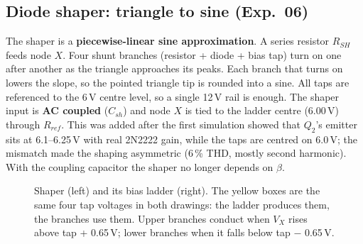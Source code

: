 \subsection{Diode shaper: triangle to sine (Exp.\ 06)}
The shaper is a \textbf{piecewise-linear sine approximation}. A series resistor $R_{SH}$ feeds node $X$. Four shunt branches (resistor + diode + bias tap) turn on one after another as the triangle approaches its peaks. Each branch that turns on lowers the slope, so the pointed triangle tip is rounded into a sine. All taps are referenced to the 6\,V centre level, so a single 12\,V rail is enough. The shaper input is \textbf{AC coupled} ($C_{sh}$) and node $X$ is tied to the ladder centre (6.00\,V) through $R_{ref}$. This was added after the first simulation showed that $Q_2$'s emitter sits at 6.1--6.25\,V with real 2N2222 gain, while the taps are centred on 6.0\,V; the mismatch made the shaping asymmetric (6\,\% THD, mostly second harmonic). With the coupling capacitor the shaper no longer depends on $\beta$.

\begin{figure}[H]
\centering
{}
\caption{Shaper (left) and its bias ladder (right). The yellow boxes are the same four tap voltages in both drawings: the ladder produces them, the branches use them. Upper branches conduct when $V_X$ rises above tap + 0.65\,V; lower branches when it falls below tap $-$ 0.65\,V.}
\label{fig:shaper}
\end{figure}

